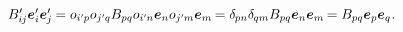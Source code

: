 \nopagebreak\vspace{-0.2em}\begin{equation*}
\scalebox{0.98}[0.99]{$
B'_{i\hspace{-0.1ex}j} \bm{e}'_{i} \bm{e}'_{\hspace{-0.1ex}j} \hspace{-0.1ex}
= \cosinematrix{i'\hspace{-0.1ex}p} \cosinematrix{j'\hspace{-0.1ex}q} B_{pq} \cosinematrix{i'\hspace{-0.1ex}n} \bm{e}_n \cosinematrix{j'\hspace{-0.1ex}m} \bm{e}_m \hspace{-0.2ex}
= \delta_{\hspace{-0.1ex}pn} \delta_{\hspace{-0.1ex}qm} B_{pq} \bm{e}_n \bm{e}_m \hspace{-0.2ex}
= B_{pq} \bm{e}_p \bm{e}_q
$}
\hspace{.1ex} .
\end{equation*}

